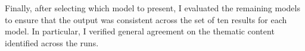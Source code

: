 Finally, after selecting which model to present, I evaluated the
remaining models to ensure that the output was consistent across the
set of ten results for each model. In particular, I verified general
agreement on the thematic content identified across the runs.






